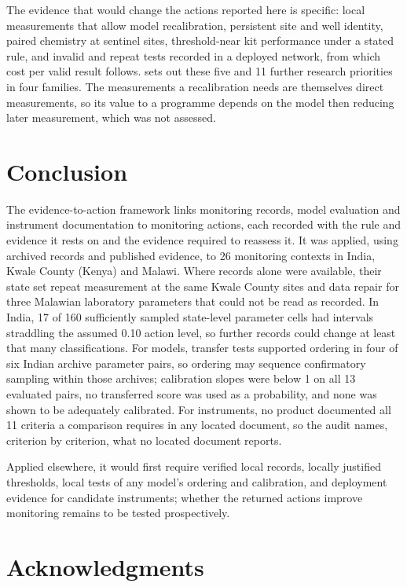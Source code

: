 \documentclass[10pt,letterpaper]{article}
\begin{document}
The evidence that would change the actions reported here is specific: local measurements that allow model recalibration, persistent site and well identity, paired chemistry at sentinel sites, threshold-near kit performance under a stated rule, and invalid and repeat tests recorded in a deployed network, from which cost per valid result follows.  sets out these five and 11 further research priorities in four families. The measurements a recalibration needs are themselves direct measurements, so its value to a programme depends on the model then reducing later measurement, which was not assessed.

\FloatBarrier

\section*{Conclusion}

The evidence-to-action framework links monitoring records, model evaluation and instrument documentation to monitoring actions, each recorded with the rule and evidence it rests on and the evidence required to reassess it. It was applied, using archived records and published evidence, to 26 monitoring contexts in India, Kwale County (Kenya) and Malawi. Where records alone were available, their state set repeat measurement at the same Kwale County sites and data repair for three Malawian laboratory parameters that could not be read as recorded. In India, 17 of 160 sufficiently sampled state-level parameter cells had intervals straddling the assumed 0.10 action level, so further records could change at least that many classifications. For models, transfer tests supported ordering in four of six Indian archive \texttimes{} parameter pairs, so ordering may sequence confirmatory sampling within those archives; calibration slopes were below 1 on all 13 evaluated pairs, no transferred score was used as a probability, and none was shown to be adequately calibrated. For instruments, no product documented all 11 criteria a comparison requires in any located document, so the audit names, criterion by criterion, what no located document reports.

Applied elsewhere, it would first require verified local records, locally justified thresholds, local tests of any model's ordering and calibration, and deployment evidence for candidate instruments; whether the returned actions improve monitoring remains to be tested prospectively.

\FloatBarrier
\section*{Acknowledgments}
\end{document}

